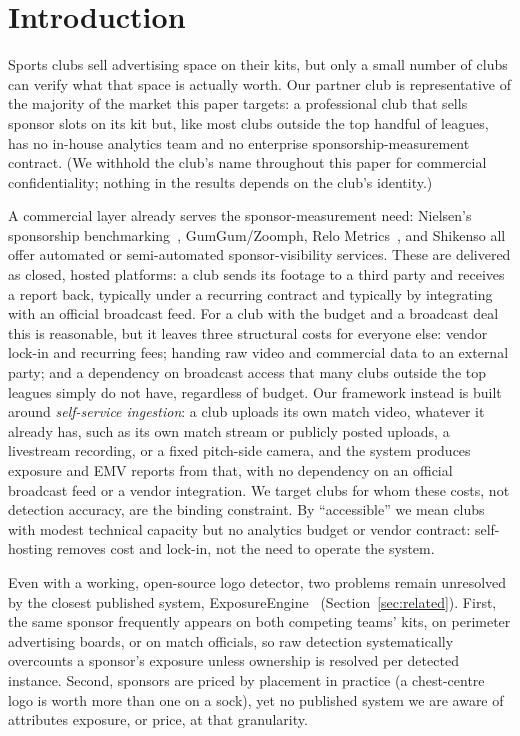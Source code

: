 \documentclass[conference,a4paper]{IEEEtran}
\begin{document}
\section{Introduction}
\label{sec:intro}

Sports clubs sell advertising space on their kits, but only a small number of clubs can
verify what that space is actually worth. Our partner club is representative of the majority of the market this paper targets: a
professional club that sells sponsor slots on its kit but, like most clubs outside the
top handful of leagues, has no in-house analytics team and no enterprise
sponsorship-measurement contract. (We withhold the
club's name throughout this paper for commercial confidentiality; nothing in the
results depends on the club's identity.)

A commercial layer already serves the sponsor-measurement need: Nielsen's sponsorship
benchmarking~\cite{nielsen_sponsorship_benchmark}, GumGum/Zoomph, Relo
Metrics~\cite{relometrics_ai}, and Shikenso all offer automated or semi-automated
sponsor-visibility services. These are delivered as closed, hosted platforms: a club
sends its footage to a third party and receives a report back, typically under a
recurring contract and typically by integrating with an official broadcast feed. For a
club with the budget and a broadcast deal this is reasonable, but it leaves three
structural costs for everyone else: vendor lock-in and recurring fees; handing raw
video and commercial data to an external party; and a dependency on broadcast access
that many clubs outside the top leagues simply do not have, regardless of budget. Our framework instead is built around \emph{self-service ingestion}: a club
uploads its own match video, whatever it already has, such as its own match stream or
publicly posted uploads, a livestream recording, or a fixed pitch-side camera, and the
system produces exposure and EMV reports from that, with no dependency on an official
broadcast feed or a vendor integration. We target clubs for whom these costs, not
detection accuracy, are the binding constraint. By ``accessible'' we mean clubs with
modest technical capacity but no analytics budget or vendor contract: self-hosting
removes cost and lock-in, not the need to operate the system.

Even with a working, open-source logo detector, two problems remain unresolved by the
closest published system, ExposureEngine~\cite{exposureengine} (Section~\ref{sec:related}).
First, the same sponsor frequently appears on both competing teams' kits, on
perimeter advertising boards, or on match officials, so raw detection systematically
overcounts a sponsor's exposure unless ownership is resolved per detected instance.
Second, sponsors are priced by placement in practice (a chest-centre logo is worth
more than one on a sock), yet no published system we are aware of attributes exposure,
or price, at that granularity.
\end{document}
